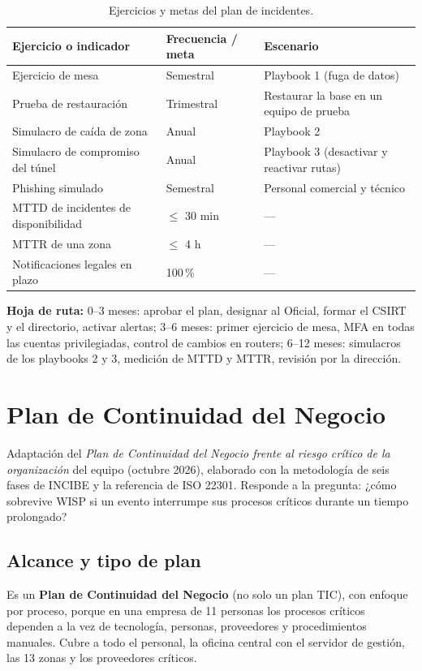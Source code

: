 \begin{table}[H]
\centering
\caption{Ejercicios y metas del plan de incidentes.}
\label{tab:anx-inc-pruebas}
\small
\begin{tabularx}{\textwidth}{XL{2.2cm}X}
\toprule
\textbf{Ejercicio o indicador} & \textbf{Frecuencia / meta} & \textbf{Escenario} \\
\midrule
Ejercicio de mesa & Semestral & Playbook 1 (fuga de datos) \\
Prueba de restauración & Trimestral & Restaurar la base en un equipo de prueba \\
Simulacro de caída de zona & Anual & Playbook 2 \\
Simulacro de compromiso del túnel & Anual & Playbook 3 (desactivar y reactivar rutas) \\
Phishing simulado & Semestral & Personal comercial y técnico \\
MTTD de incidentes de disponibilidad & $\leq$ 30 min & --- \\
MTTR de una zona & $\leq$ 4 h & --- \\
Notificaciones legales en plazo & 100\,\% & --- \\
\bottomrule
\end{tabularx}
\end{table}

\noindent\textbf{Hoja de ruta:} 0--3 meses: aprobar el plan, designar al Oficial, formar el
CSIRT y el directorio, activar alertas; 3--6 meses: primer ejercicio de mesa, MFA en todas las
cuentas privilegiadas, control de cambios en routers; 6--12 meses: simulacros de los playbooks
2 y 3, medición de MTTD y MTTR, revisión por la dirección.

\chapter{Plan de Continuidad del Negocio}
\label{anx:sgsi-continuidad}

Adaptación del \emph{Plan de Continuidad del Negocio frente al riesgo crítico de la
organización} del equipo (octubre 2026), elaborado con la metodología de seis fases de INCIBE
y la referencia de ISO 22301. Responde a la pregunta: ¿cómo sobrevive WISP si un evento
interrumpe sus procesos críticos durante un tiempo prolongado?

\section{Alcance y tipo de plan}
Es un \textbf{Plan de Continuidad del Negocio} (no solo un plan TIC), con enfoque por proceso,
porque en una empresa de 11 personas los procesos críticos dependen a la vez de tecnología,
personas, proveedores y procedimientos manuales. Cubre a todo el personal, la oficina central
con el servidor de gestión, las 13 zonas y los proveedores críticos.

